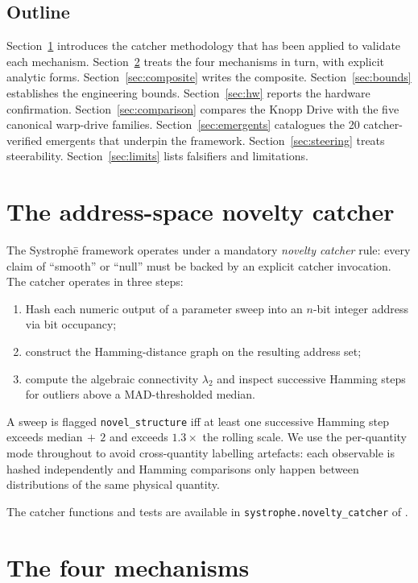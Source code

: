 \documentclass[11pt,a4paper]{article}
\begin{document}
\subsection{Outline}
Section~\ref{sec:catcher} introduces the catcher methodology that has been applied to validate each mechanism. Section~\ref{sec:mechanisms} treats the four mechanisms in turn, with explicit analytic forms. Section~\ref{sec:composite} writes the composite. Section~\ref{sec:bounds} establishes the engineering bounds. Section~\ref{sec:hw} reports the hardware confirmation. Section~\ref{sec:comparison} compares the Knopp Drive with the five canonical warp-drive families. Section~\ref{sec:emergents} catalogues the 20 catcher-verified emergents that underpin the framework. Section~\ref{sec:steering} treats steerability. Section~\ref{sec:limits} lists falsifiers and limitations.

\section{The address-space novelty catcher}\label{sec:catcher}

The Systroph\=e framework operates under a mandatory \emph{novelty catcher} rule: every claim of ``smooth'' or ``null'' must be backed by an explicit catcher invocation. The catcher operates in three steps:
\begin{enumerate}[label=(\arabic*)]
\item Hash each numeric output of a parameter sweep into an $n$-bit integer address via bit occupancy;
\item construct the Hamming-distance graph on the resulting address set;
\item compute the algebraic connectivity $\lambda_{2}$ and inspect successive Hamming steps for outliers above a MAD-thresholded median.
\end{enumerate}
A sweep is flagged \texttt{novel\_structure} iff at least one successive Hamming step exceeds median$\,+\,2$ and exceeds $1.3\times$ the rolling scale. We use the per-quantity mode throughout to avoid cross-quantity labelling artefacts: each observable is hashed independently and Hamming comparisons only happen between distributions of the same physical quantity.

The catcher functions and tests are available in \texttt{systrophe.novelty\_catcher} of \cite{SystropheRepo}.

\section{The four mechanisms}\label{sec:mechanisms}
\end{document}
